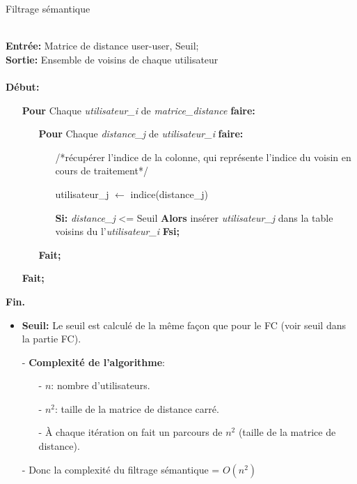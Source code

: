  \begin{algorithm}[H]
	\caption{Filtrage sémantique}
	\hspace*{\algorithmicindent} \\
	\hspace*{\algorithmicindent} \textbf{Entrée:} Matrice de distance user-user, Seuil;\\
	\hspace*{\algorithmicindent} \textbf{Sortie:} Ensemble de voisins de chaque utilisateur \\\\
	\hspace*{\algorithmicindent}\textbf{ Début:}
	\begin{itemize}
		
		\item []\textbf{Pour} Chaque \textit{utilisateur{\_}i} de \textit{matrice{\_}distance} \textbf{faire:} 
		\begin{itemize}
		\item []\textbf{Pour} Chaque \textit{distance{\_}j} de \textit{utilisateur{\_}i} \textbf{faire:} 
		\begin{itemize}
				\item [] /*récupérer l'indice de la colonne, qui représente l'indice du voisin en cours de traitement*/
			\item [] utilisateur{\_}j  $\leftarrow$ indice(distance{\_}j) 
			
			\item [] \textbf{Si:} \textit{distance{\_}j}  <= Seuil \textbf{Alors} insérer \textit{utilisateur{\_}j}  dans la table voisins du l'\textit{utilisateur{\_}i }\textbf{Fsi;}
		\end{itemize}
	
\item []  \textbf{Fait;}
\end{itemize}
\item []  \textbf{Fait;}
	\end{itemize}
	\hspace*{\algorithmicindent}\textbf{ Fin.}
\end{algorithm} 

\begin{itemize}
	\item \textbf{Seuil:} Le seuil est calculé de la même façon que pour le FC (voir seuil dans la partie FC).
\end{itemize}

\begin{itemize}
	\item [-] \textbf{Complexité de l'algorithme}:
	\begin{itemize}
		\item [-] $n$: nombre d'utilisateurs.
		\item [-] $n^2$: taille de la matrice de distance carré.
		\item [-] À chaque itération on fait un parcours de $n^2$ (taille de la matrice de distance).
	\end{itemize}
\item [-]  Donc la complexité du filtrage sémantique = $O(n^2)$
\end{itemize}

